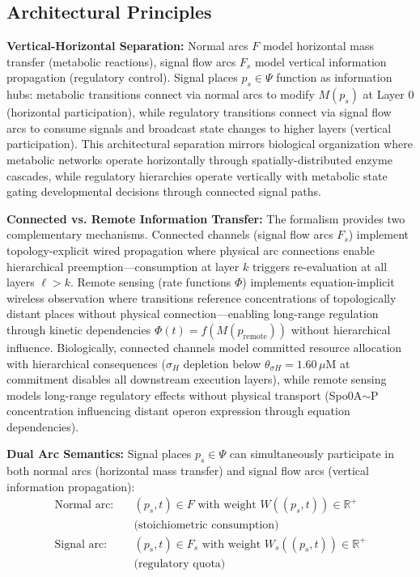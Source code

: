 \documentclass[10pt,letterpaper]{article}
\begin{document}
\subsection{Architectural Principles}

\textbf{Vertical-Horizontal Separation:} Normal arcs $F$ model horizontal mass transfer (metabolic reactions), signal flow arcs $F_s$ model vertical information propagation (regulatory control). Signal places $p_s \in \Psi$ function as information hubs: metabolic transitions connect via normal arcs to modify $M(p_s)$ at Layer 0 (horizontal participation), while regulatory transitions connect via signal flow arcs to consume signals and broadcast state changes to higher layers (vertical participation). This architectural separation mirrors biological organization where metabolic networks operate horizontally through spatially-distributed enzyme cascades, while regulatory hierarchies operate vertically with metabolic state gating developmental decisions through connected signal paths.

\textbf{Connected vs. Remote Information Transfer:} The formalism provides two complementary mechanisms. Connected channels (signal flow arcs $F_s$) implement topology-explicit wired propagation where physical arc connections enable hierarchical preemption---consumption at layer $k$ triggers re-evaluation at all layers $\ell > k$. Remote sensing (rate functions $\Phi$) implements equation-implicit wireless observation where transitions reference concentrations of topologically distant places without physical connection---enabling long-range regulation through kinetic dependencies $\Phi(t) = f(M(p_{\text{remote}}))$ without hierarchical influence. Biologically, connected channels model committed resource allocation with hierarchical consequences ($\sigma_H$ depletion below $\theta_{\sigma H} = 1.60\,\mu$M at commitment disables all downstream execution layers), while remote sensing models long-range regulatory effects without physical transport (Spo0A$\sim$P concentration influencing distant operon expression through equation dependencies).

\textbf{Dual Arc Semantics:} Signal places $p_s \in \Psi$ can simultaneously participate in both normal arcs (horizontal mass transfer) and signal flow arcs (vertical information propagation):
\begin{align}
\text{Normal arc}: &\quad (p_s, t) \in F \text{ with weight } W((p_s,t)) \in \mathbb{R}^+ \nonumber \\
&\quad \text{(stoichiometric consumption)} \\
\text{Signal arc}: &\quad (p_s, t) \in F_s \text{ with weight } W_s((p_s,t)) \in \mathbb{R}^+ \nonumber \\
&\quad \text{(regulatory quota)}
\end{align}
\end{document}
